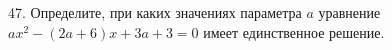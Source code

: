 47. Определите, при каких значениях параметра $a$ уравнение $ax^2-(2a+6)x+3a+3=0$ имеет единственное решение.\\
